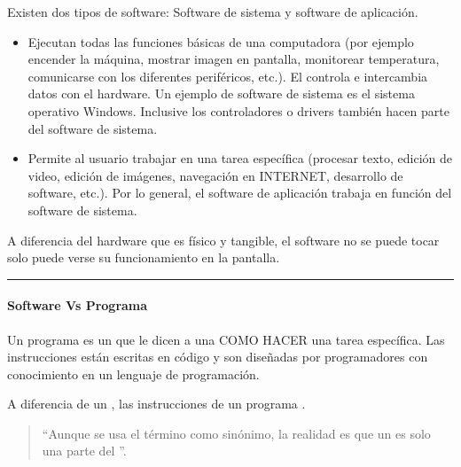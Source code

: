 \documentclass[letterpaper,10pt,spanish]{sphinxmanual}
\begin{document}
\sphinxAtStartPar
Existen dos tipos de software: Software de sistema y software de aplicación.
\begin{itemize}
\item {} 
\sphinxAtStartPar
{} Ejecutan todas las funciones básicas de una computadora (por ejemplo encender la máquina, mostrar imagen en pantalla, monitorear temperatura, comunicarse con los diferentes periféricos, etc.). El  controla e intercambia datos con el hardware. Un ejemplo de software de sistema es el sistema operativo Windows. Inclusive los controladores o drivers también hacen parte del software de sistema.

\item {} 
\sphinxAtStartPar
{} Permite al usuario trabajar en una tarea específica (procesar texto, edición de video, edición de imágenes, navegación en INTERNET, desarrollo de software, etc.). Por lo general, el software de aplicación trabaja en función del software de sistema.

\end{itemize}

\sphinxAtStartPar
A diferencia del hardware que es físico y tangible, el software no se puede tocar \sphinxhyphen{} solo puede verse su funcionamiento en la pantalla.


\bigskip\hrule\bigskip



\paragraph{Software Vs Programa}
\label{\detokenize{cursos/ofimatica11/recursos/T01:software-vs-programa}}
\sphinxAtStartPar
Un programa es un  que le dicen a una  COMO HACER una tarea específica. Las instrucciones están escritas en código y son diseñadas por programadores con conocimiento en un lenguaje de programación.

\sphinxAtStartPar
A diferencia de un , las instrucciones de un programa .
\begin{quote}

\sphinxAtStartPar
“Aunque se usa el término  como sinónimo, la realidad es que un  es solo una parte del ”.
\end{quote}
\end{document}
